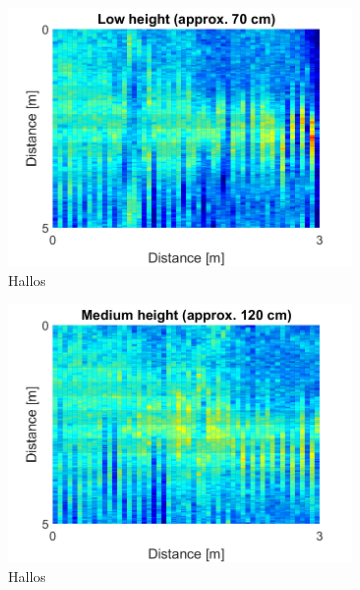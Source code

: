 \begin{minipage}{0.9\textwidth}

\begin{figure}[H]
\captionsetup{belowskip=0em}
\begin{subfigure}[b]{0.326\textwidth}
\includegraphics[width=\textwidth]{figures/Not_Norm_space_1.png}
\caption{Hallos}
\label{1}
\end{subfigure}
\begin{subfigure}[b]{0.326\textwidth}
\includegraphics[width=\textwidth]{figures/Not_Norm_space_2.png}
\caption{Hallos}
\label{2}
\end{subfigure}
\begin{subfigure}[b]{0.326\textwidth}

\end{subfigure}
\end{figure}
\end{minipage}
